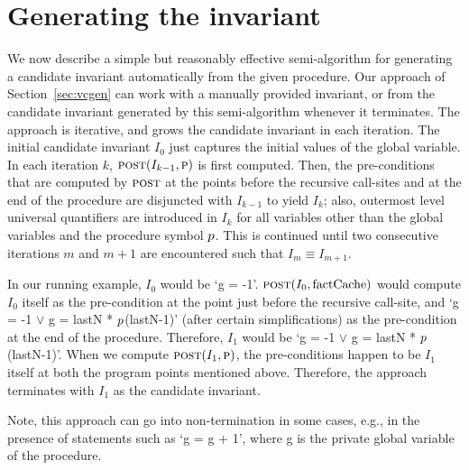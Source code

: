 \section{Generating the invariant}
\label{sec:invariant}

We now describe a simple but reasonably effective semi-algorithm for
generating a candidate invariant automatically from the given
procedure. Our approach of Section~\ref{sec:vcgen} can work with a manually
provided invariant, or from the candidate invariant generated by this
semi-algorithm whenever it terminates. The approach is iterative, and
grows the candidate invariant in each iteration. The initial candidate
invariant $I_0$ just captures the initial values of the global variable. In
each iteration $k$, $\textsc{post}(I_{k-1}, \textsc{p})$ is first computed. Then, the
pre-conditions that are computed by $\textsc{post}$ at the points before the
recursive call-sites and at the end of the procedure are disjuncted with
$I_{k-1}$ to yield $I_k$; also, outermost level universal quantifiers are
introduced in $I_k$ for all variables other than the global variables and
the procedure symbol $p$.  This is continued until two consecutive
iterations $m$ and $m+1$ are encountered such that $I_m \equiv I_{m+1}$.

In our running example, $I_0$ would be `g = -1'. $\textsc{post}(I_0,
\mathrm{factCache})$ would compute $I_0$ itself as the pre-condition at the
point just before the recursive call-site, and `g = -1 $\vee$ g = lastN *
$p$(lastN-1)' (after certain simplifications) as the pre-condition
at the end of the
procedure. Therefore, $I_1$ would be `g = -1 $\vee$ g = lastN *
$p$(lastN-1)'. When we compute $\textsc{post}(I_1, \textsc{p})$, the
pre-conditions happen to be $I_1$ itself at both the program points
mentioned above. Therefore, the approach terminates with $I_1$ as the
candidate invariant.

Note, this approach can go into non-termination in
some cases, e.g., in the presence of statements such as `g = g + 1', where
g is the private global variable of the procedure.
